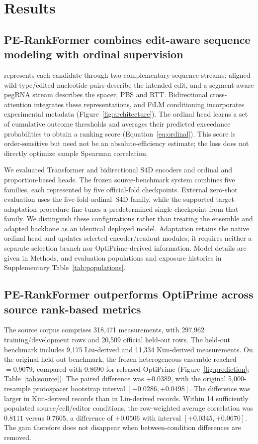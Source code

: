 \section{Results}
\subsection{PE-RankFormer combines edit-aware sequence modeling with ordinal supervision}
\model{} represents each candidate through two complementary sequence streams: aligned wild-type/edited nucleotide pairs describe the intended edit, and a segment-aware pegRNA stream describes the spacer, PBS and RTT. Bidirectional cross-attention integrates these representations, and FiLM conditioning incorporates experimental metadata (Figure~\ref{fig:architecture}). The ordinal head learns a set of cumulative outcome thresholds and averages their predicted exceedance probabilities to obtain a ranking score (Equation~\ref{eq:ordinal}). This score is order-sensitive but need not be an absolute-efficiency estimate; the loss does not directly optimize sample Spearman correlation.

We evaluated Transformer and bidirectional S4D encoders and ordinal and proportion-based heads. The frozen source-benchmark system combines five families, each represented by five official-fold checkpoints. External zero-shot evaluation uses the five-fold ordinal--S4D family, while the supported target-adaptation procedure fine-tunes a predetermined single checkpoint from that family. We distinguish these configurations rather than treating the ensemble and adapted backbone as an identical deployed model. Adaptation retains the native ordinal head and updates selected encoder/readout modules; it requires neither a separate selection branch nor OptiPrime-derived information. Model details are given in Methods, and evaluation populations and exposure histories in Supplementary Table~\ref{tab:populations}.



\subsection{PE-RankFormer outperforms OptiPrime across source rank-based metrics}
The source corpus comprises 318,471 measurements, with 297,962 training/development rows and 20,509 official held-out rows. The held-out benchmark includes 9,175 Liu-derived and 11,334 Kim-derived measurements.
On the original held-out benchmark, the frozen heterogeneous \model{} ensemble reached \rhoS{} $=0.9079$, compared with $0.8690$ for released OptiPrime (Figure~\ref{fig:prediction}; Table~\ref{tab:source}). The paired difference was $+0.0389$, with the original 5,000-resample protospacer bootstrap interval $[+0.0286,+0.0498]$. The difference was larger in Kim-derived records than in Liu-derived records. Within 14 sufficiently populated source/cell/editor conditions, the row-weighted average correlation was $0.8111$ versus $0.7605$, a difference of $+0.0506$ with interval $[+0.0345,+0.0670]$. The gain therefore does not disappear when between-condition differences are removed.

